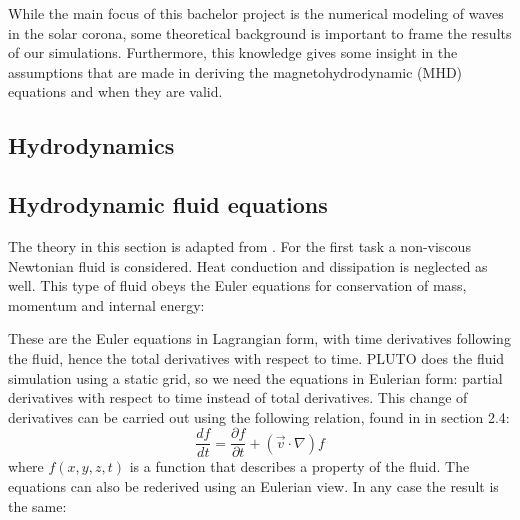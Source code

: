 While the main focus of this bachelor project is the numerical modeling of waves in the solar corona, some theoretical background is important to frame the results of our simulations.
Furthermore, this knowledge gives some insight in the assumptions that are made in deriving the magnetohydrodynamic (MHD) equations and when they are valid.

\subsection*{Hydrodynamics}

\subsection{Hydrodynamic fluid equations}
The theory in this section is adapted from \cite{notes-fluid-dynamics}. For the first task a non-viscous Newtonian fluid is considered. Heat conduction and dissipation is neglected as well.
This type of fluid obeys the Euler equations for conservation of mass, momentum and internal energy:

{\centering
\noindent {}\par}


These are the Euler equations in Lagrangian form, with time derivatives following the fluid, hence the total derivatives with respect to time.
PLUTO does the fluid simulation using a static grid, so we need the equations in Eulerian form: partial derivatives with respect to time instead of total derivatives.
This change of derivatives can be carried out using the following relation, found in \cite{notes-fluid-dynamics} in section 2.4:
\begin{equation}
	\frac{df}{dt} = \frac{\partial f}{\partial t} + (\vec{v} \cdot \nabla) f
	\label{eq:relation-total-partial}
\end{equation}
where $f(x,y,z,t)$ is a function that describes a property of the fluid. The equations can also be rederived using an Eulerian view. In any case the result is the same:

